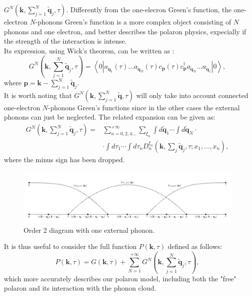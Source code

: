 $G^N(\mathbf{k},\sum_{j=1}^N\mathbf{\tilde{q}}_j,\tau)$. Differently from the one-elecron Green's function, the one-electron $N$-phonons Green's function is a more complex object consisting of 
$N$ phonons and one electron, and better describes the polaron physics, expecially if the strength of the interaction is intense.\\
Its expression, using Wick's theorem, can be written as \cite{hahn2018diagrammatic}:
\begin{equation}
    G^N(\mathbf{k},\sum_{j=1}^N\mathbf{\tilde{q}}_j,\tau)=\left\langle 0|a_{\mathbf{\tilde{q}}_1}(\tau)...a_{\mathbf{\tilde{q}}_N}(\tau)c_{\mathbf{p}}(\tau)c^\dagger_{\mathbf{p}}a_{\mathbf{\tilde{q}}_N}...a_{\mathbf{\tilde{q}}_1} |0\right\rangle,
\end{equation}
where $\mathbf{p}=\mathbf{k}-\sum_{j=1}^N\mathbf{\tilde{q}}_j$.\\
It is worth noting that $G^N(\mathbf{k},\sum_{j=1}^N\mathbf{\tilde{q}},\tau)$ will only take into account connected one-electron $N$-phonons Green's functions since in the other cases the external 
phonons can just be neglected. The related expansion can be given as:
\begin{equation}
\begin{split}
        G^N(\mathbf{k},\sum_{j=1}^N\mathbf{\tilde{q}}_j,\tau)=&\sum_{n=0,2,4...}^{+\infty}\sum_{\xi_n}\int d\mathbf{\tilde{q}}_1\cdots \int d\mathbf{\tilde{q}}_N \cdot \\
         &\cdot\int d\tau_1\cdots\int d\tau_n D_n^{\xi_n}(\mathbf{k},\sum_j\mathbf{\tilde{q}}_j,\tau;x_1,...,x_n),
\end{split}
\label{GF_N_polaron_series}
\end{equation}
where the minus sign has been dropped.
\begin{figure}[H]
    \includegraphics[scale = 0.55]{diagram_order_2_N2.pdf}
    \caption{Order 2 diagram with one external phonon.}
    \label{fig:diagram_order_2_N2}
\end{figure}
It is thus useful to consider the full function $P(\mathbf{k},\tau)$ defined as follows:
\begin{equation}
    P(\mathbf{k},\tau)=G(\mathbf{k},\tau)+\sum_{N=1}^{+\infty}G^N(\mathbf{k},\sum_{j=1}^N\mathbf{\tilde{q}}_j,\tau),
\end{equation}
which more accurately describes our polaron model, including both the "free" polaron and its interaction with the phonon cloud.

